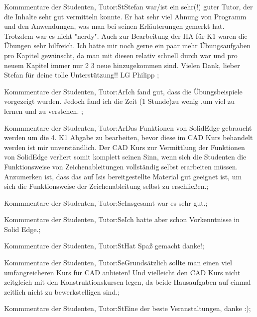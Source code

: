\documentclass[10pt]{beamer}
\begin{document}
\begin{frame}[fragile]{Kommmentare der Studenten, Tutor:St}Stefan war/ist ein sehr(!) guter Tutor, der die Inhalte sehr gut vermitteln konnte. Er hat sehr viel Ahnung von Programm und den Anwendungen, was man bei seinen Erläuterungen gemerkt hat. Trotzdem war es nicht "nerdy". Auch zur Bearbeitung der HA für K1 waren die Übungen sehr hilfreich.  Ich hätte mir noch gerne ein paar mehr Übungsaufgaben pro Kapitel gewünscht, da man mit diesen relativ schnell durch war und pro neuem Kapitel immer nur 2 3 neue hinzugekommen sind. Vielen Dank, lieber Stefan für deine tolle Unterstützung!!  LG Philipp ;
 \end{frame}
\begin{frame}[fragile]{Kommmentare der Studenten, Tutor:Ar}Ich fand gut, dass die Übungsbeispiele vorgezeigt wurden. Jedoch fand ich die Zeit (1 Stunde)zu wenig ,um viel zu lernen und zu verstehen. ;
 \end{frame}
\begin{frame}[fragile]{Kommmentare der Studenten, Tutor:Ar}Das Funktionen von SolidEdge gebraucht werden um die 4. K1 Abgabe zu bearbeiten, bevor diese im CAD Kurs behandelt werden ist mir unverständlich.  Der CAD Kurs zur Vermittlung der Funktionen von SolidEdge verliert somit komplett seinen Sinn, wenn sich die Studenten die Funktionsweise von Zeichenableitungen vollständig selbst erarbeiten müssen.  Anzumerken ist, dass das auf Isis bereitgestellte Material gut geeignet ist, um sich die Funktionsweise der Zeichenableitung selbst zu erschließen.;
 \end{frame}
\begin{frame}[fragile]{Kommmentare der Studenten, Tutor:Se}Insgesamt war es sehr gut.;
 \end{frame}
\begin{frame}[fragile]{Kommmentare der Studenten, Tutor:Se}Ich hatte aber schon Vorkenntnisse in Solid Edge.;
 \end{frame}
\begin{frame}[fragile]{Kommmentare der Studenten, Tutor:St}Hat Spaß gemacht danke!;
 \end{frame}
\begin{frame}[fragile]{Kommmentare der Studenten, Tutor:Se}Grundsätzlich sollte man einen viel umfangreicheren Kurs für CAD anbieten!  Und vielleicht den CAD Kurs nicht zeitgleich mit den Konstruktionskursen legen, da beide Hausaufgaben auf einmal zeitlich nicht zu bewerkstelligen sind.;
 \end{frame}
\begin{frame}[fragile]{Kommmentare der Studenten, Tutor:St}Eine der beste Veranstaltungen, danke :);
 \end{frame}
\end{document}
